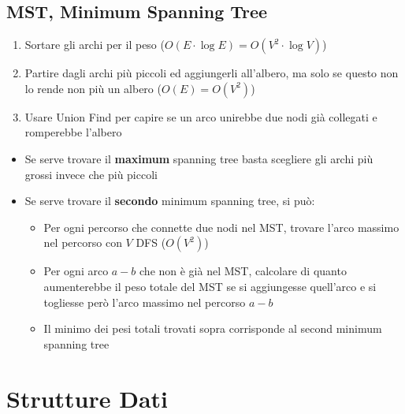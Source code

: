 \documentclass{article}
\begin{document}
\subsection{MST, Minimum Spanning Tree}
\begin{enumerate}
    \item Sortare gli archi per il peso ($O(E\cdot \log E)=O(V^2\cdot \log V)$)
    \item Partire dagli archi più piccoli ed aggiungerli all'albero, ma solo se questo non lo rende non più un albero ($O(E)=O(V^2)$)
    \item Usare Union Find per capire se un arco unirebbe due nodi già collegati e romperebbe l'albero
\end{enumerate}
\begin{itemize}
    \item Se serve trovare il \textbf{maximum} spanning tree basta scegliere gli archi più grossi invece che più piccoli
    \item Se serve trovare il \textbf{secondo} minimum spanning tree, si può:
    \begin{itemize}
        \item Per ogni percorso che connette due nodi nel MST, trovare l'arco massimo nel percorso con $V$ DFS ($O(V^2)$)
        \item Per ogni arco $a-b$ che non è già nel MST, calcolare di quanto aumenterebbe il peso totale del MST se si aggiungesse quell'arco e si togliesse però l'arco massimo nel percorso $a-b$
        \item Il minimo dei pesi totali trovati sopra corrisponde al second minimum spanning tree
    \end{itemize}
\end{itemize}

\section{Strutture Dati}
\end{document}
